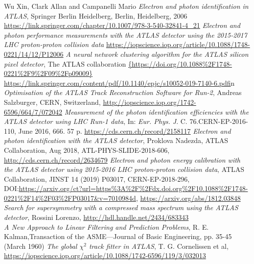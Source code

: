 \documentclass[a4paper, oneside]{book}
\begin{document}
\begin{thebibliography}{32}
			 Wu Xin, Clark Allan and Campanelli Mario \textit{Electron and photon identification in ATLAS}, Springer Berlin Heidelberg, Berlin, Heidelberg, 2006
			\url{https://link.springer.com/chapter/10.1007/978-3-540-32841-4_21} 
			\textit{Electron and photon performance measurements with the {ATLAS} detector using the 2015-2017 {LHC} proton-proton collision data}
			\url{https://iopscience.iop.org/article/10.1088/1748-0221/14/12/P12006}
			 \textit{A neural network clustering algorithm for the ATLAS silicon pixel detector}, The ATLAS collaboration
			\url{{https://doi.org/10.1088%2F1748-0221%2F9%2F09%2Fp09009}}
			\url{https://link.springer.com/content/pdf/10.1140/epjc/s10052-019-7140-6.pdf}in
			 \textit{Optimisation of the ATLAS Track Reconstruction Software for Run-2}, Andreas Salzburger, CERN, Switzerland, \url{http://iopscience.iop.org/1742-6596/664/7/072042}
			\textit{Measurement of the photon identification efficiencies with the ATLAS detector using LHC Run-1 data}, In: \textit{Eur. Phys. J}. C. 76.CERN-EP-2016-110, June 2016, 666. 57 p. 
			\url{https://cds.cern.ch/record/2158117} 
			 \textit{Electron and photon identification with the ATLAS detector}, Proklova Nadezda, ATLAS Collaboration, Aug 2018, ATL-PHYS-SLIDE-2018-606, \url{http://cds.cern.ch/record/2634679}
			\textit{Electron and photon energy calibration with the ATLAS detector using 2015-2016 LHC proton-proton collision data}, ATLAS Collaboration, JINST 14 (2019) P03017, CERN-EP-2018-296,  DOI:\url{https://arxiv.org/ct?url=https%3A%2F%2Fdx.doi.org%2F10.1088%2F1748-0221%2F14%2F03%2FP03017&v=7010984d}, 
			\url{https://arxiv.org/abs/1812.03848}
			 \textit{Search for supersymmetry with a compressed mass spectrum using the ATLAS detector}, Rossini Lorenzo, \url{http://hdl.handle.net/2434/683343 }\\
			 \textit{A New Approach to Linear Filtering and Prediction Problems}, R. E. Kalman,Transaction of the ASME—Journal of Basic Engineering,
			pp. 35-45 (March 1960)
			\textit{The global $\chi^2$ track fitter in ATLAS}, T. G. Cornelissen et al, \url{https://iopscience.iop.org/article/10.1088/1742-6596/119/3/032013}

\end{thebibliography}
\end{document}
